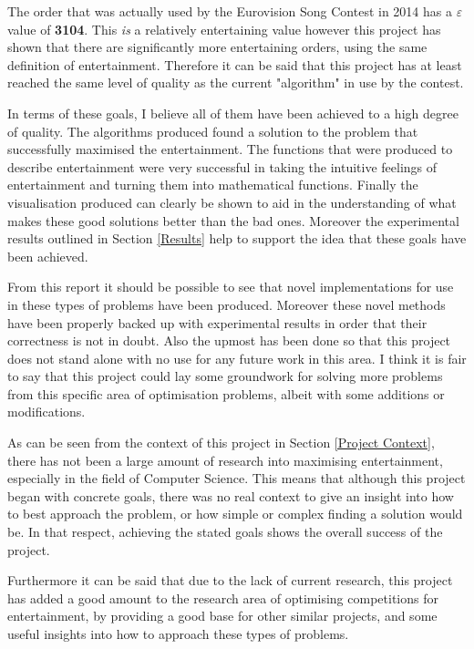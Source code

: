 \documentclass[12pt]{report}
\begin{document}
The order that was actually used by the Eurovision Song Contest in 2014 has a $\varepsilon$ value of \textbf{3104}. This \textit{is} a relatively entertaining value however this project has shown that there are significantly more entertaining orders, using the same definition of entertainment. Therefore it can be said that this project has at least reached the same level of quality as the current "algorithm" in use by the contest.

In terms of these goals, I believe all of them have been achieved to a high degree of quality. The algorithms produced found a solution to the problem that successfully maximised the entertainment. The functions that were produced to describe entertainment were very successful in taking the intuitive feelings of entertainment and turning them into mathematical functions. Finally the visualisation produced can clearly be shown to aid in the understanding of what makes these good solutions better than the bad ones. Moreover the experimental results outlined in Section \ref{Results} help to support the idea that these goals have been achieved.

From this report it should be possible to see that novel implementations for use in these types of problems have been produced. Moreover these novel methods have been properly backed up with experimental results in order that their correctness is not in doubt. Also the upmost has been done so that this project does not stand alone with no use for any future work in this area. I think it is fair to say that this project could lay some groundwork for solving more problems from this specific area of optimisation problems, albeit with some additions or modifications.

As can be seen from the context of this project in Section \ref{Project Context}, there has not been a large amount of research into maximising entertainment, especially in the field of Computer Science. This means that although this project began with concrete goals, there was no real context to give an insight into how to best approach the problem, or how simple or complex finding a solution would be. In that respect, achieving the stated goals shows the overall success of the project. 

Furthermore it can be said that due to the lack of current research, this project has added a good amount to the research area of optimising competitions for entertainment, by providing a good base for other similar projects, and some useful insights into how to approach these types of problems.
\end{document}
